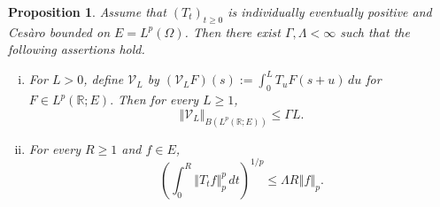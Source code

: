\documentclass[12pt]{amsart}
\theoremstyle{plain}
\newtheorem{prop}[thm]{Proposition}
\theoremstyle{remark}
\theoremstyle{definition}
\newcommand{\R}{\mathbb{R}}
\newcommand{\norm}[1]{\left\Vert #1\right\Vert}
\begin{document}
	\begin{prop}\label{propIndividualEstimates} Assume that $(T_t)_{t\ge0}$ is individually eventually positive and Ces\`aro bounded on $E=L^p(\Omega)$. 
		Then there exist $\Gamma,\Lambda<\infty$ such that the following assertions hold. \begin{enumerate}[(i)] 
			\item For $L>0$, define $\mathcal V_L$  by $(\mathcal V_LF)(s) := \int_0^L T_uF(s+u)\,du$ for $F\in L^p(\R;E).$ Then for every $L \ge 1$, \begin{equation}\label{eqIndividualConvolution}
				\norm{\mathcal V_L}_{B(L^p(\R;E))} \le \Gamma L. 
			\end{equation} \item For every $R\ge1$ and $f\in E$, \begin{equation}\label{eqIndividualOrbit} \left( \int_0^R\norm{T_tf}_p^p\,dt \right)^{1/p} \le \Lambda R\norm{f}_p. \end{equation} \end{enumerate}
	\end{prop} 
\end{document}

